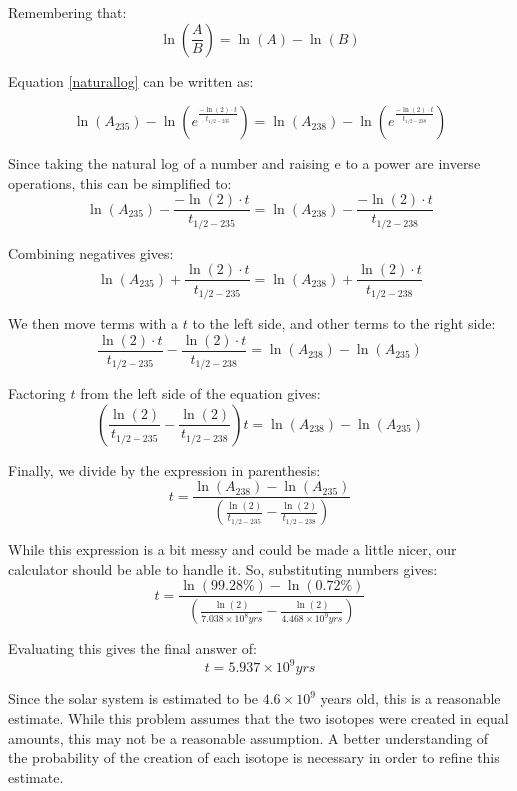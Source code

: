 \documentclass[letterpaper, 12pt]{article}
\begin{document}
Remembering that: \begin{equation}
\ln\left(\frac{A}{B}\right) = \ln(A) - \ln(B)
\end{equation}

Equation \ref{naturallog} can be written as:

\begin{equation}
\ln(A_{235}) - \ln \left(e^{\frac{-\ln(2)\cdot t}{t_{1/2-235}}}\right) = \ln(A_{238}) - \ln \left(e^{\frac{-\ln(2)\cdot t}{t_{1/2-238}}}\right)
\end{equation}

Since taking the natural log of a number and raising e to a power are inverse operations, this can be simplified to:
\begin{equation}
\ln(A_{235}) - \frac{-\ln(2)\cdot t}{t_{1/2-235}} = \ln(A_{238}) -  \frac{-\ln(2)\cdot t}{t_{1/2-238}}
\end{equation}

Combining negatives gives:
\begin{equation}
\ln(A_{235}) + \frac{\ln(2)\cdot t}{t_{1/2-235}} = \ln(A_{238}) +  \frac{\ln(2)\cdot t}{t_{1/2-238}}
\end{equation}

We then move terms with a $t$ to the left side, and other terms to the right side:
\begin{equation}
\frac{\ln(2)\cdot t}{t_{1/2-235}} - \frac{\ln(2)\cdot t}{t_{1/2-238}} = \ln(A_{238}) - \ln(A_{235})
\end{equation}

Factoring $t$ from the left side of the equation gives:
\begin{equation}
\left(\frac{\ln(2)}{t_{1/2-235}} - \frac{\ln(2)}{t_{1/2-238}}\right) t = \ln(A_{238}) - \ln(A_{235})
\end{equation}

Finally, we divide by the expression in parenthesis:
\begin{equation}
t = \frac{\ln(A_{238}) - \ln(A_{235})}{\left(\frac{\ln(2)}{t_{1/2-235}} - \frac{\ln(2)}{t_{1/2-238}}\right)}
\end{equation}

While this expression is a bit messy and could be made a little nicer, our calculator should be able to handle it.  So, substituting numbers gives:  
\begin{equation}
t = \frac{\ln(99.28\%) - \ln(0.72\%)}{\left(\frac{\ln(2)}{7.038 \times 10^8\si{yrs}} - \frac{\ln(2)}{4.468 \times 10^9\si{yrs}}\right)}
\end{equation}


Evaluating this gives the final answer of:
\begin{equation}
\boxed{t=5.937 \times 10^9 \si{yrs}}
\end{equation}

Since the solar system is estimated to be $4.6 \times 10^9$ years old, this is a reasonable estimate.  While this problem assumes that the two isotopes were created in equal amounts, this may not be a reasonable assumption.  A better understanding of the probability of the creation of each isotope is necessary in order to refine this estimate.  
\end{document}
